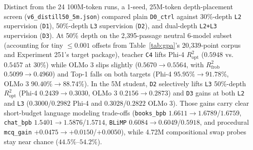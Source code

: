 \documentclass[conference]{IEEEtran}
\begin{document}
Distinct from the 24 100M-token runs, a 1-seed, 25M-token depth-placement screen (\texttt{v6\_distill50\_5m.json}) compared plain \texttt{D0\_ctrl} against 30\%-depth \texttt{L2} supervision (\texttt{D1}), 50\%-depth \texttt{L3} supervision (\texttt{D2}), and dual-depth \texttt{L2+L3} supervision (\texttt{D3}). At 50\% depth on the 2,395-passage neutral 6-model subset (accounting for tiny $\le 0.001$ offsets from Table~\ref{tab:gpa}'s 20,339-point corpus and Experiment 251's target package), teacher \texttt{C4} lifts Phi-4 $R^2_{\text{opt}}$ ($0.5948$ vs.\ $0.5457$ at 30\%) while OLMo 3 slips slightly ($0.5670\to0.5564$, with $R^2_{\text{frob}}$ $0.5099\to0.4960$) and Top-1 falls on both targets (Phi-4 $95.95\%\to91.78\%$, OLMo 3 $90.40\%\to88.74\%$). In the 5M student, \texttt{D2} selectively lifts \texttt{L3} 50\%-depth $R^2_{\text{opt}}$ (Phi-4 $0.2439\to0.3030$, OLMo 3 $0.2156\to0.2873$) and \texttt{D3} gains at both \texttt{L2} and \texttt{L3} ($0.3000$/$0.2982$ Phi-4 and $0.3028$/$0.2822$ OLMo 3). Those gains carry clear short-budget language modeling trade-offs (\texttt{books\_bpb} $1.6611\to1.6789$/$1.6759$, \texttt{chat\_bpb} $1.5401\to1.5876$/$1.5714$, \texttt{BLiMP} $0.6084\to0.6049$/$0.5918$, and procedural \texttt{mcq\_gain} $+0.0475\to+0.0150$/$+0.0050$), while 4.72M compositional swap probes stay near chance ($44.5\%$--$54.2\%$).
\end{document}
